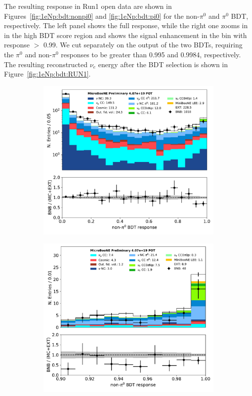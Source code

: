 \documentclass[a4paper]{article}
\newcommand{\nue}{$\nu_e$ }
\begin{document}
The resulting response in Run1 open data are shown in Figures~\ref{fig:1eNp:bdt:nonpi0} and \ref{fig:1eNp:bdt:pi0} for the non-$\pi^0$ and $\pi^0$ BDT, respectively. The left panel shows the full response, while the right one zooms in in the high BDT score region and shows the signal enhancement in the bin with response $>$ 0.99. We cut separately on the output of the two BDTs, requiring the $\pi^0$ and non-$\pi^0$ responses to be greater than 0.995 and 0.9984, respectively. The resulting reconstructed \nue energy after the BDT selection is shown in Figure~\ref{fig:1eNp:bdt:RUN1}.

\begin{figure}[H] 
\begin{center}
    \begin{subfigure}[b]{0.45\textwidth}
    \centering
    \includegraphics[width=1.00\textwidth]{1eNp/nonpi0_score_01162020_RUN1.pdf}
    \caption{\label{fig:1eNp:bdt:nonpi0:all}}
    \end{subfigure}
    \begin{subfigure}[b]{0.45\textwidth}
    \centering
    \includegraphics[width=1.00\textwidth]{1eNp/nonpi0_score_zoom_01162020_RUN1.pdf}

\end{subfigure}
\end{center}
\end{figure}
\end{document}
